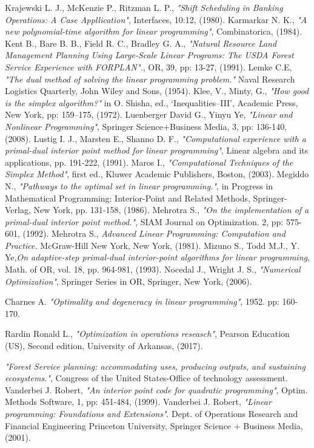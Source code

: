 \documentclass[a4paper,10 pt,titlepage,twoside]{book}
\theoremstyle{plain}
\theoremstyle{definition}
\theoremstyle{remark}
\begin{document}
\begin{thebibliography}{9}
		Krajewski L. J., McKenzie P., Ritzman L. P., \textit{ "Shift Scheduling in Banking Operations: A Case Appllication"}, Interfaces, 10:12, (1980).
		 Karmarkar N. K.,\emph{ "A new polynomial-time algorithm for linear programming"}, Combinatorica, (1984).
		 Kent B., Bare B. B., Field R. C., Bradley G. A., \textit{"Natural Resource Land Management Planning Using Large-Scale Linear Programs: The USDA Forest Service Experience with FORPLAN".}, OR, 39, pp: 13-27, (1991).
		 Lemke C.E, \textit{ "The dual method of solving the linear programming problem."} Naval Research Logistics Quarterly, John Wiley and Sons, (1954).
		 Klee, V., Minty, G., \emph{ "How good is the simplex algorithm?"} in O. Shisha, ed., ‘Inequalities–III’, Academic Press, New York, pp: 159–175, (1972).
		Luenberger David G., Yinyu Ye, \emph{"Linear and Nonlinear Programming"}, Springer Science+Business Media, 3, pp: 136-140, (2008).
		 Lustig I. J., Marsten E., Shanno D. F., \emph{ "Computational experience with a primal-dual interior point method for linear programming"}, Linear algebra and its applications, pp. 191-222, (1991).
		 Maros I., \emph{ "Computational Techniques of the Simplex Method"}, first ed., Kluwer
		Academic Publishers, Boston, (2003).
		 Megiddo N., \emph{ "Pathways to the optimal set in linear programming."}, in Progress in Mathematical Programming: Interior-Point and Related Methods, Springer-Verlag, New York, pp. 131-158, (1986).
	 Mehrotra S., \emph{ "On the implementation of a primal-dual interior point method."}, SIAM Journal on Optimization. 2, pp: 575-601, (1992).
	 Mehrotra S., \emph{ Advanced Linear Programming: Computation and
	Practice. } McGraw-Hill New York, New York, (1981).
		Mizuno S., Todd M.J., Y. Ye,\emph{\;On adaptive-step primal-dual interior-point algorithms for linear programming}, Math. of OR, vol. 18, pp. 964-981, (1993). 
	Nocedal J., Wright J. S., \emph{\;"Numerical Optimization"}, Springer Series in OR, Springer, New York, (2006).

	  Charnes A. \emph{ "Optimality and degeneracy in linear programming"}, 1952. pp: 160-170. 

 Rardin Ronald L., \textit{"Optimization in operations reseasch"}, Pearson Education (US), Second edition, University of Arkansas, (2017).

 \emph{"Forest Service planning: accommodating uses, producing outputs, and sustaining ecosystems."}, Congress of the United States-Office of technology assessment.
 Vanderbei J. Robert, \emph{\;"An interior point code for quadratic programming"}, Optim. Methods Software, 1, pp: 451-484, (1999). 
 Vanderbei J. Robert, \emph{\;"Linear programming:
Foundations and Extensions"}. Dept. of Operations Research and Financial Engineering
Princeton University, Springer Science + Business Media, (2001).


\end{thebibliography}
\end{document}
